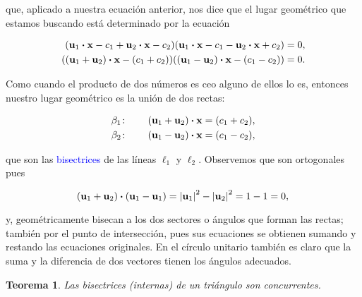 \documentclass{article}
\theoremstyle{definicion}
\theoremstyle{definition}             %
\theoremstyle{definition}             %
\theoremstyle{definition}
\theoremstyle{definition}
\theoremstyle{observacion}
\theoremstyle{definition}
\theoremstyle{plain}
\newtheorem{theorem}{Teorema}
\theoremstyle{definition}
\theoremstyle{afirmacion}
\theoremstyle{notation}
\theoremstyle{definition}
\begin{document}
        que, aplicado a nuestra ecuación anterior, nos dice que el lugar geométrico que estamos buscando está determinado por la ecuación 

        \begin{align*}
            (\vb{u}_{1} \vdot \vb{x} - c_{1} + \vb{u}_{2} \vdot \vb{x} - c_{2})(\vb{u}_{1} \vdot \vb{x} - c_{1} - \vb{u}_{2} \vdot \vb{x} + c_{2}) &= 0,\\
            ((\vb{u}_{1} + \vb{u}_{2}) \vdot \vb{x} - (c_{1} + c_{2}))((\vb{u}_{1} - \vb{u}_{2}) \vdot \vb{x} - (c_{1} - c_{2})) &= 0.
        \end{align*}

        Como cuando el producto de dos números es ceo alguno de ellos lo es, entonces nuestro lugar geométrico es la unión de dos rectas:

        \begin{align*}
            \beta_{1} \colon\qquad (\vb{u}_{1} + \vb{u}_{2}) \vdot \vb{x} &= (c_{1} + c_{2}),\\
            \beta_{2} \colon\qquad (\vb{u}_{1} - \vb{u}_{2}) \vdot \vb{x} &= (c_{1} - c_{2}),
        \end{align*}

        que son las \textcolor{blue}{bisectrices} de las líneas \(\ell_{1}\) y \(\ell_{2}\). Observemos que son ortogonales pues 

        \begin{equation*}
            (\vb{u}_{1} + \vb{u}_{2}) \vdot (\vb{u}_{1} - \vb{u}_{1}) = \abs{\vb{u}_{1}}^{2} - \abs{\vb{u}_{2}}^{2} = 1 - 1 = 0,\\
        \end{equation*}

        y, geométricamente bisecan a los dos sectores o ángulos que forman las rectas; también por el punto de intersección, pues sus ecuaciones se obtienen sumando y restando las ecuaciones originales. En el círculo unitario también es claro que la suma y la diferencia de dos vectores tienen los ángulos adecuados.

        \begin{theorem}
            Las bisectrices (internas) de un triángulo son concurrentes.
        \end{theorem}
\end{document}
